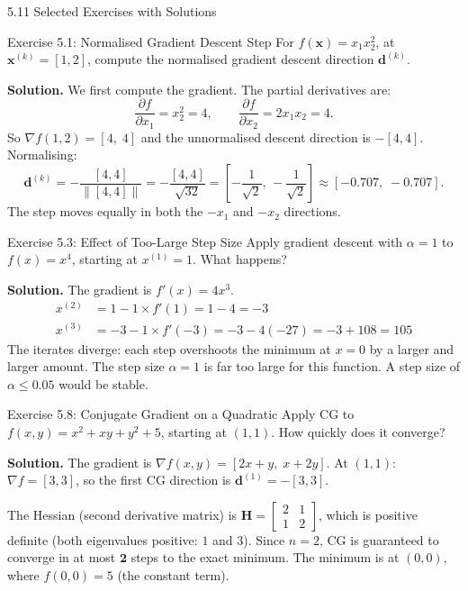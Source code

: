 \documentclass[aspectratio=169,10pt]{beamer}
\newcommand{\vx}{\mathbf{x}}
\newcommand{\vd}{\mathbf{d}}
\begin{document}
\begin{frame}[allowframebreaks]{5.11 Selected Exercises with Solutions}

  \begin{block}{Exercise 5.1: Normalised Gradient Descent Step}
    For $f(\vx) = x_1 x_2^2$, at $\vx^{(k)} = [1, 2]$,
    compute the normalised gradient descent direction $\vd^{(k)}$.
  \end{block}

  \textbf{Solution.}  We first compute the gradient.  The partial
  derivatives are:
  \[
    \frac{\partial f}{\partial x_1} = x_2^2 = 4,
    \qquad
    \frac{\partial f}{\partial x_2} = 2x_1 x_2 = 4.
  \]
  So $\nabla f(1,2) = [4,\; 4]$ and the unnormalised descent
  direction is $-[4,4]$.  Normalising:
  \[
    \vd^{(k)} = -\frac{[4, 4]}{\|[4,4]\|}
              = -\frac{[4,4]}{\sqrt{32}}
              = \left[-\frac{1}{\sqrt{2}},\, -\frac{1}{\sqrt{2}}\right]
              \approx [-0.707,\; -0.707].
  \]
  The step moves equally in both the $-x_1$ and $-x_2$ directions.

  \bigskip
  \begin{block}{Exercise 5.3: Effect of Too-Large Step Size}
    Apply gradient descent with $\alpha=1$ to $f(x)=x^4$,
    starting at $x^{(1)}=1$.  What happens?
  \end{block}

  \textbf{Solution.}  The gradient is $f'(x)=4x^3$.
  \begin{align*}
    x^{(2)} &= 1 - 1\times f'(1) = 1 - 4 = -3\\
    x^{(3)} &= -3 - 1\times f'(-3) = -3 - 4(-27) = -3 + 108 = 105
  \end{align*}
  The iterates diverge: each step overshoots the minimum at $x=0$
  by a larger and larger amount.  The step size $\alpha=1$ is
  far too large for this function.  A step size of $\alpha \le 0.05$
  would be stable.

  \framebreak

  \begin{block}{Exercise 5.8: Conjugate Gradient on a Quadratic}
    Apply CG to $f(x,y)=x^2+xy+y^2+5$, starting at $(1,1)$.
    How quickly does it converge?
  \end{block}

  \textbf{Solution.}  The gradient is
  $\nabla f(x,y) = [2x+y,\; x+2y]$.
  At $(1,1)$: $\nabla f = [3, 3]$, so the first CG direction is
  $\vd^{(1)} = -[3, 3]$.

  The Hessian (second derivative matrix) is
  $\mathbf{H} = \begin{bmatrix} 2 & 1 \\ 1 & 2 \end{bmatrix}$,
  which is positive definite (both eigenvalues positive: $1$ and $3$).
  Since $n=2$, CG is guaranteed to converge in at most $\mathbf{2}$
  steps to the exact minimum.  The minimum is at $(0,0)$, where
  $f(0,0)=5$ (the constant term).


\end{frame}
\end{document}
